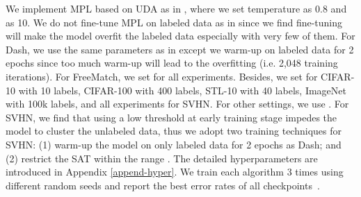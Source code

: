 \documentclass{article} \usepackage{iclr2023_conference,times}
\theoremstyle{plain}
\theoremstyle{definition}
\theoremstyle{remark}
\newcommand{\ourmethod}{FreeMatch\xspace}
\begin{document}
We implement MPL based on UDA as in \citep{pham2021meta}, where we set temperature as 0.8 and  as 10. We do not fine-tune MPL on labeled data as in \citep{pham2021meta} since we find fine-tuning will make the model overfit the labeled data especially with very few of them. For Dash, we use the same parameters as in \citep{xu2021dash} except we warm-up on labeled data for 2 epochs since too much warm-up will lead to the overfitting (i.e. 2,048 training iterations).
For \ourmethod, we set  for all experiments. Besides, we set  for CIFAR-10 with 10 labels, CIFAR-100 with 400 labels, STL-10 with 40 labels, ImageNet with 100k labels, and all experiments for SVHN. For other settings, we use .
For SVHN, we find that using a low threshold at early training stage impedes the model to cluster the unlabeled data, thus we adopt two training techniques for SVHN: (1) warm-up the model on only labeled data for 2 epochs as Dash; and (2) restrict the SAT within the range .
The detailed hyperparameters are introduced in Appendix \ref{append-hyper}.
We train each algorithm 3 times using different random seeds and report the best error rates of all checkpoints~\citep{zhang2021flexmatch}.
\end{document}
